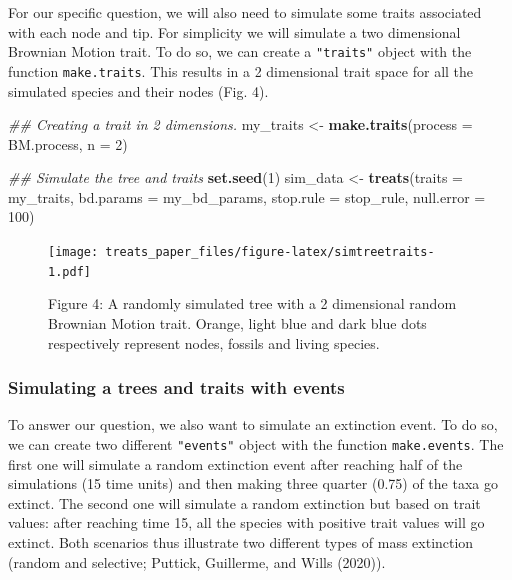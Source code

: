 \documentclass[
]{article}
\newenvironment{Shaded}{\begin{snugshade}}{\end{snugshade}}
\newcommand{\CommentTok}[1]{\textcolor[rgb]{0.56,0.35,0.01}{\textit{#1}}}
\newcommand{\DataTypeTok}[1]{\textcolor[rgb]{0.13,0.29,0.53}{#1}}
\newcommand{\DecValTok}[1]{\textcolor[rgb]{0.00,0.00,0.81}{#1}}
\newcommand{\KeywordTok}[1]{\textcolor[rgb]{0.13,0.29,0.53}{\textbf{#1}}}
\newcommand{\NormalTok}[1]{#1}
\newcommand{\StringTok}[1]{\textcolor[rgb]{0.31,0.60,0.02}{#1}}
\begin{document}
For our specific question, we will also need to simulate some traits
associated with each node and tip. For simplicity we will simulate a two
dimensional Brownian Motion trait. To do so, we can create a
\texttt{"traits"} object with the function \texttt{make.traits}. This
results in a 2 dimensional trait space for all the simulated species and
their nodes (Fig. 4).

\begin{Shaded}
\begin{Highlighting}[]
\CommentTok{\#\# Creating a trait in 2 dimensions.}
\NormalTok{my\_traits \textless{}{-}}\StringTok{ }\KeywordTok{make.traits}\NormalTok{(}\DataTypeTok{process =}\NormalTok{ BM.process, }\DataTypeTok{n =} \DecValTok{2}\NormalTok{)}

\CommentTok{\#\# Simulate the tree and traits}
\KeywordTok{set.seed}\NormalTok{(}\DecValTok{1}\NormalTok{)}
\NormalTok{sim\_data \textless{}{-}}\StringTok{ }\KeywordTok{treats}\NormalTok{(}\DataTypeTok{traits     =}\NormalTok{ my\_traits,}
                   \DataTypeTok{bd.params  =}\NormalTok{ my\_bd\_params,}
                   \DataTypeTok{stop.rule  =}\NormalTok{ stop\_rule,}
                   \DataTypeTok{null.error =} \DecValTok{100}\NormalTok{)}
\end{Highlighting}
\end{Shaded}

\begin{figure}
\centering
\texttt{[image: treats\_paper\_files/figure-latex/simtreetraits-1.pdf]}
\caption{Figure 4: A randomly simulated tree with a 2 dimensional random
Brownian Motion trait. Orange, light blue and dark blue dots
respectively represent nodes, fossils and living species.}
\end{figure}

\hypertarget{simulating-a-trees-and-traits-with-events}{%
\subsubsection{Simulating a trees and traits with
events}\label{simulating-a-trees-and-traits-with-events}}

To answer our question, we also want to simulate an extinction event. To
do so, we can create two different \texttt{"events"} object with the
function \texttt{make.events}. The first one will simulate a random
extinction event after reaching half of the simulations (15 time units)
and then making three quarter (0.75) of the taxa go extinct. The second
one will simulate a random extinction but based on trait values: after
reaching time 15, all the species with positive trait values will go
extinct. Both scenarios thus illustrate two different types of mass
extinction (random and selective; Puttick, Guillerme, and Wills (2020)).
\end{document}
